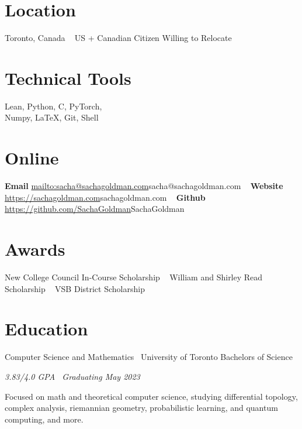 \documentclass[]{style}
\begin{document}

\begin{aside} %
\section{Location}
Toronto, Canada
~ \vspace{-2mm}
US + Canadian Citizen 
Willing to Relocate
\section{Technical Tools}
Lean, Python, C, PyTorch, \\ Numpy, \LaTeX, Git, Shell
\section{Online}
\textbf{Email}
\url{mailto:sacha@sachagoldman.com}{sacha@sachagoldman.com} 
~ \vspace{-2mm}
\textbf{Website} 
\url{https://sachagoldman.com}{sachagoldman.com} 
~ \vspace{-2mm}
\textbf{Github}
\url{https://github.com/SachaGoldman}{SachaGoldman}
\section{Awards}
New College Council 
In-Course Scholarship
~ \vspace{-1mm}
William and Shirley Read 
Scholarship
~ \vspace{-1mm}
VSB District Scholarship
\end{aside}

\section{Education}

\begin{entrylist}

\entry
{Computer Science and Mathematics \ {\normalfont University of Toronto}}
{Bachelors of Science}
{\emph{3.83/4.0 GPA \ Graduating May 2023}
~ \vspace{1mm}

Focused on math and theoretical computer science, studying differential topology, complex analysis, riemannian geometry, probabilistic learning, and quantum computing, and more.}

\end{entrylist}
\end{document}
